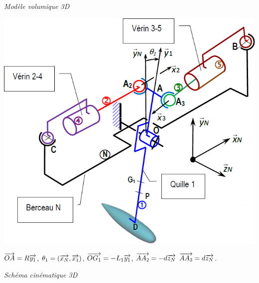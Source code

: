 \documentclass[10pt,fleqn]{article} %
\begin{document}
\begin{multicols}{2}
\begin{center}
\textit{Modèle volumique 3D}
\end{center}

\begin{center}
\includegraphics[width=\linewidth]{images/fig_04}


$\overrightarrow{OA}=R\overrightarrow{y_1}$, 
$\theta_1 =\left(\overrightarrow{x_N},\overrightarrow{x_1}\right)$,
$\overrightarrow{OG_1}=-L_1\overrightarrow{y_1}$,
$\overrightarrow{AA_2}=-d\overrightarrow{z_N}$
$\overrightarrow{AA_3}=d\overrightarrow{z_N} $.


\textit{Schéma cinématique 3D}
\end{center}


\end{multicols}
\end{document}
